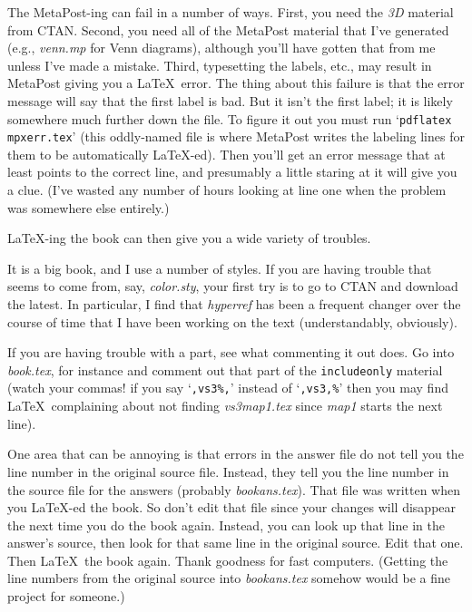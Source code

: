 \documentclass[titlepage]{article}
\begin{document}
The MetaPost-ing can fail in a number of ways.
First, you need the \textit{3D} material from CTAN.
Second, you need all of the MetaPost material that I've generated
(e.g., \textit{venn.mp} for Venn diagrams), although
you'll have gotten that from me unless I've made a mistake.
Third, typesetting the labels, etc., may result in MetaPost 
giving you a \LaTeX\ error.
The thing about this failure is that the error message 
will say that the first label is bad.
But it isn't the first label; it is likely somewhere much further
down the file.
To figure it out you must run 
`\verb!pdflatex mpxerr.tex!' (this oddly-named file is where MetaPost writes
the labeling lines for them to be automatically \LaTeX-ed).
Then you'll get an error message that at least points to the correct line,
and presumably a little staring at it will give you a clue.
(I've wasted any number of hours looking at line one when the 
problem was somewhere else entirely.)  

\LaTeX-ing the book can then give you a wide variety of
troubles.

It is a big book, and I use a number of styles.
If you are having trouble that seems to come from, say, \textit{color.sty},
your first try is to go to CTAN and download the latest.
In particular, I find that \textit{hyperref} has been a frequent
changer over the course of time that I have been working on the
text (understandably, obviously).

If you are having trouble with a part, see what commenting it out does.
Go into \textit{book.tex}, for instance and comment out that 
part of the \verb!includeonly! material (watch your commas! if you
say `\verb!,vs3%,!' instead of `\verb!,vs3,%!' then you may find 
\LaTeX\ complaining about
not finding \textit{vs3map1.tex} since \textit{map1} starts
the next line).

One area that can be annoying is that errors in the answer file do not
tell you the line number in the original source file.
Instead, they tell you the line number in the source file for the answers
(probably \textit{bookans.tex}).
That file was written when you \LaTeX-ed the book.
So don't edit that file since your changes will disappear the next time
you do the book again.
Instead, you can look up that line in the answer's source,
then look for that same line in the original source.
Edit that one.
Then \LaTeX\ the book again.
Thank goodness for fast computers.
(Getting the line numbers from the original source into \textit{bookans.tex} 
somehow would be a fine project for someone.)
\end{document}
